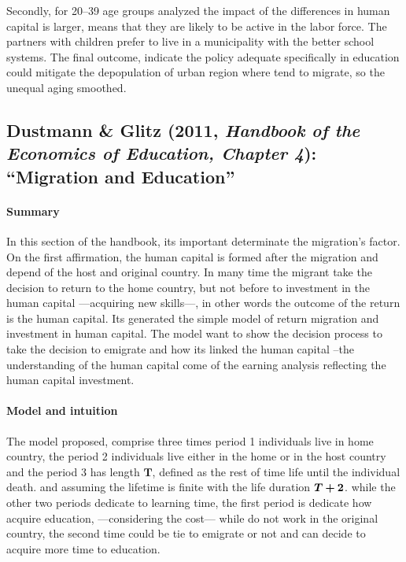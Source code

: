 \documentclass[11pt]{article}
\theoremstyle{prop}
\begin{document}
	Secondly, for 20–39 age groups analyzed the impact of the differences in human capital is larger, means that they are likely to be active in the labor force. The partners with children prefer to live in a municipality with the better school systems. The final outcome, indicate the policy adequate specifically in education could mitigate the depopulation of urban region where tend to migrate, so the unequal aging smoothed. 
			
	\subsection{Dustmann \& Glitz (2011, \textit{Handbook of the Economics of Education, Chapter 4}): ``Migration and Education''}
	\paragraph{Summary}
	In this section of the handbook, its important determinate the migration's factor. On the first affirmation, the human capital is formed after the migration and depend of the host and original country. In many time the migrant take the decision to return to the home country, but not before to investment in the human capital ---acquiring new skills---, in other words the outcome of the return is the human capital.
	Its generated the simple model of return migration and investment in human capital. The model want to show the decision process to take the decision to emigrate and how its linked the human capital --the understanding of the human capital come of the earning analysis reflecting the human capital investment.
	
 	\paragraph {Model and intuition} 
 	
 	The model proposed, comprise three times {\color{BlueG}period 1} individuals live in home country, the {\color{BlueG}period 2} individuals live either in the home or in the host country and the {\color{BlueG}period 3} has length $\bm{T}$, defined as the rest of time life until the individual death. and assuming the lifetime is finite with the life duration {\color{orange}$\hm{T+2}$}. while the other two periods dedicate to learning time, the first period is dedicate how acquire education, ---considering the cost--- while do not work in the original country, the second time could be tie to emigrate or not and can decide to acquire more time to education.
\end{document}
